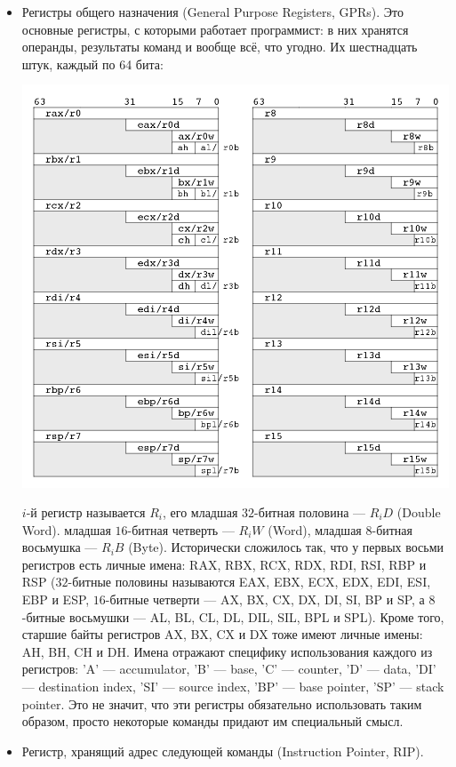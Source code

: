 \documentclass[11pt]{book}
\begin{document}
\begin{itemize}
\item Регистры общего назначения (General Purpose Registers, GPRs).
Это основные регистры, с которыми работает программист:
в них хранятся операнды, результаты команд и вообще всё, что угодно.
Их шестнадцать штук, каждый по 64 бита:
\\
\includegraphics[height=5in]{pic/registers_general_purpose.png}
\\
$i$-й регистр называется $R_i$,
его младшая $32$-битная половина --- $R_iD$ (Double Word).
младшая $16$-битная четверть --- $R_iW$ (Word),
младшая $8$-битная восьмушка --- $R_iB$ (Byte).
Исторически сложилось так, что у первых восьми регистров есть личные имена: RAX, RBX, RCX, RDX, RDI, RSI, RBP и RSP
($32$-битные половины называются EAX, EBX, ECX, EDX, EDI, ESI, EBP и ESP, $16$-битные четверти --- AX, BX, CX, DX, DI, SI, BP и SP,
а $8$-битные восьмушки --- AL, BL, CL, DL, DIL, SIL, BPL и SPL).
Кроме того, старшие байты регистров AX, BX, CX и DX тоже имеют личные имены: AH, BH, CH и DH.
Имена отражают специфику использования каждого из регистров: 'A' --- accumulator, 'B' --- base, 'C' --- counter, 'D' --- data,
'DI' --- destination index, 'SI' --- source index, 'BP' --- base pointer, 'SP' --- stack pointer.
Это не значит, что эти регистры обязательно использовать таким образом, просто некоторые команды придают им специальный смысл.
\item Регистр, хранящий адрес следующей команды (Instruction Pointer, RIP).

\end{itemize}
\end{document}
